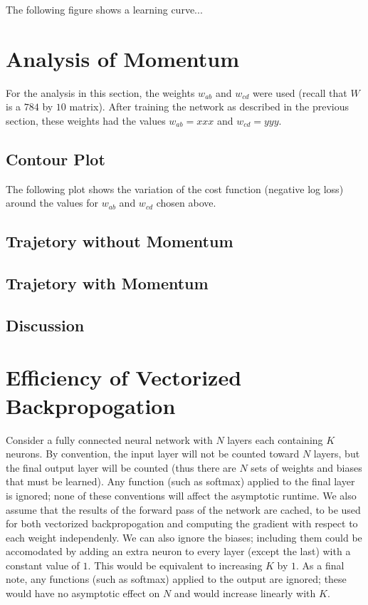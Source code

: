 \documentclass{article}
\begin{document}
   The following figure shows a learning curve...


   \section{Analysis of Momentum}
   For the analysis in this section, the weights $w_{ab}$ and $w_{cd}$ were used (recall that $W$ is
   a $784$ by $10$ matrix). After training the network as described in the previous section,
   these weights had the values $w_{ab} = xxx$ and $w_{cd} = yyy$.

   \subsection{Contour Plot}
   The following plot shows the variation of the cost function (negative log loss) around the
   values for $w_{ab}$ and $w_{cd}$ chosen above.

   \subsection{Trajetory without Momentum}

   \subsection{Trajetory with Momentum}

   \subsection{Discussion}




   \section{Efficiency of Vectorized Backpropogation}
   Consider a fully connected neural network with $N$ layers each containing $K$ neurons. By convention,
   the input layer will not be counted toward $N$ layers, but the final output layer will be
   counted (thus there are $N$ sets of weights and biases that must be learned). Any function
   (such as softmax) applied to the final layer is ignored; none of these conventions will
   affect the asymptotic runtime. We also assume that the results of the forward pass of the
   network are cached, to be used for both vectorized backpropogation and computing the
   gradient with respect to each weight independenly.
   We can also ignore the biases; including them could be accomodated by adding an extra
   neuron to every layer (except the last) with a constant value of $1$. This would be
   equivalent to increasing $K$ by $1$. As a final note, any functions (such as softmax) applied
   to the output are ignored; these would have no asymptotic effect on $N$ and would increase
   linearly with $K$.
\end{document}
